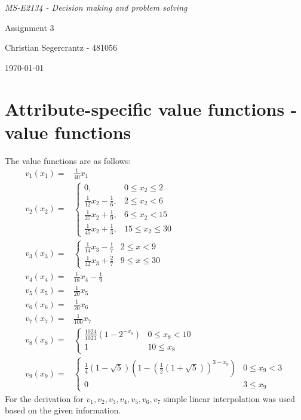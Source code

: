 \documentclass{article}
\begin{document}
	\textit{MS-E2134 - Decision making and problem solving}
	\vfill
	{\centering \Huge Assignment 3 \par}
	\vfill
	Christian Segercrantz - 481056 \\
	\par \today
	\pagebreak
	\tableofcontents
	\pagebreak
\section{Attribute-specific value functions - value functions}
The value functions are as follows:
\begin{align}
	v_1(x_1) =& \frac{1}{40}x_1 \\
	v_2(x_2) =& 
		\begin{cases}
		 0,& 0 \leq x_2 \leq 2 \\
		 \frac{1}{12}x_2 -\frac{1}{6},& 2 \leq x_2 < 6 \\
		 \frac{1}{27}x_2 +\frac{1}{9},& 6 \leq x_2 < 15 \\
		 \frac{1}{45}x_2 +\frac{1}{3},& 15 \leq x_2 \leq 30
		\end{cases}\\
	v_3(x_3) =&
		\begin{cases}
			\frac{1}{14}x_3 - \frac{1}{7} & 2 \leq x <9\\
			\frac{1}{42}x_3 + \frac{2}{7} & 9 \leq x \leq 30
		\end{cases} \\
	v_4(x_4) =& \frac{1}{18}x_4 - \frac{1}{9}\\ 
	v_5(x_5) =& \frac{1}{20}x_5\\
	v_6(x_6) =& \frac{1}{20}x_6\\
	v_7(x_7) =& \frac{1}{100}x_7\\
	v_8(x_8) =& 
		\begin{cases}
			\frac{1024}{1023}\left(1-2^{-x_8}\right) & 0 \leq x_8 < 10 \\
			1 &  10 \leq x_8
		\end{cases} \\
	v_9(x_9) =&
		\begin{cases}
			 \frac{1}{4}(1-\sqrt{5})\left(1-\left(\frac{1}{2}\left(1+\sqrt{5}\right)\right)^{3-x_9}\right) & 0 \leq x_9 < 3 \\
			 0 & 3 \leq x_9
		\end{cases}
\end{align}
For the derivation for $v_1, v_2, v_3, v_4, v_5, v_6, v_7$ simple linear interpolation was used based on the given information. 
\end{document}
